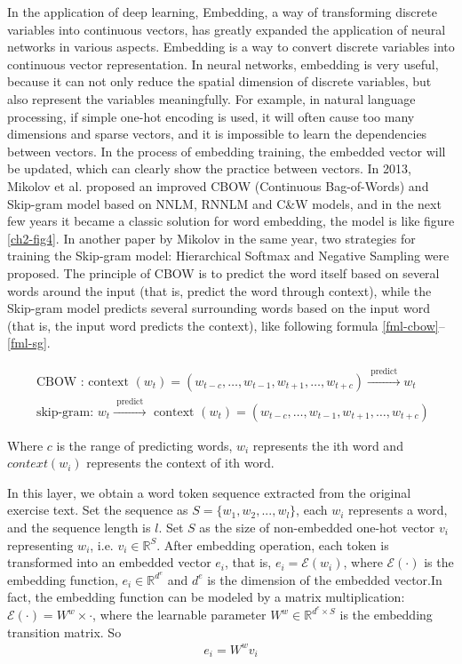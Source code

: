 In the application of deep learning, Embedding, a way of transforming discrete variables into continuous vectors, has greatly expanded the application of neural networks in various aspects. Embedding is a way to convert discrete variables into continuous vector representation. In neural networks, embedding is very useful, because it can not only reduce the spatial dimension of discrete variables, but also represent the variables meaningfully. For example, in natural language processing, if simple one-hot encoding is used, it will often cause too many dimensions and sparse vectors, and it is impossible to learn the dependencies between vectors. In the process of embedding training, the embedded vector will be updated, which can clearly show the practice between vectors. In 2013, Mikolov et al. proposed an improved CBOW (Continuous Bag-of-Words) and Skip-gram model based on NNLM, RNNLM and C\&W models\cite{mikolov2013efficient}, and in the next few years it became a classic solution for word embedding, the model is like figure \ref{ch2-fig4}. In another paper by Mikolov in the same year, two strategies for training the Skip-gram model: Hierarchical Softmax and Negative Sampling were proposed\cite{mikolov2013distributed}. The principle of CBOW is to predict the word itself based on several words around the input (that is, predict the word through context), while the Skip-gram model predicts several surrounding words based on the input word (that is, the input word predicts the context), like following formula \ref{fml-cbow}--\ref{fml-sg}.

\begin{align}
	\text { CBOW : context }\left(w_{t}\right)=\left(w_{t-c}, \ldots, w_{t-1}, w_{t+1}, \ldots, w_{t+c}\right) \stackrel{\text { predict }}{\longrightarrow} w_{t} \label{fml-cbow} \\
	\text { skip-gram: } w_{t} \stackrel{\text { predict }}{\longrightarrow} \text { context }\left(w_{t}\right)=\left(w_{t-c}, \ldots, w_{t-1}, w_{t+1}, \ldots, w_{t+c}\right) \label{fml-sg}
\end{align}

Where \(c\) is the range of predicting words, \(w_i\) represents the ith word and \(context(w_i)\) represents the context of ith word.

In this layer, we obtain a word token sequence extracted from the original exercise text. Set the sequence as \(S=\{w_1,w_2,...,w_l\}\), each \(w_i\) represents a word, and the sequence length is \(l\). Set \(S\) as the size of non-embedded one-hot vector \(v_i\) representing \(w_i\), i.e. \(v_i\in \mathbb{R}^{S}\). After embedding operation, each token is transformed into an embedded vector \(e_i\), that is, \(e_i=\mathcal{E}(w_i)\), where \(\mathcal{E}(\cdot)\) is the embedding function, \(e_i\in \mathbb{R}^{d^{e}}\) and \(d^e\) is the dimension of the embedded vector.In fact, the embedding function can be modeled by a matrix multiplication: \(\mathcal {E} (\cdot) = W^w\times \cdot\), where the learnable parameter \(W^w\in \mathbb {R} ^ {d^{e}\times S}\) is the embedding transition matrix. So
\begin{align}
	e_i = W^w v_i
\end{align}


